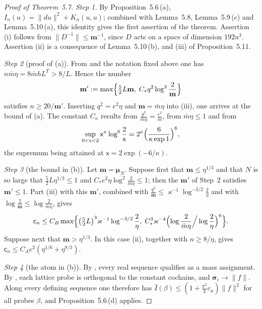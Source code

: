 \documentclass[11pt,letterpaper,reqno]{amsart}
\theoremstyle{definition}
\begin{document}
\begin{proof}[Proof of Theorem~5.7]
\emph{Step 1.}
By Proposition~5.6\,(a), $I_n(u)=\|du\|^2+K_n(u,u)$; combined with Lemma~5.8, Lemma~5.9\,(c) and Lemma~5.10\,(a), this identity gives the first assertion of the theorem.
Assertion (i) follows from $\|D^{-1}\|\le\mathbf m^{-1}$, since $D$ acts on a space of dimension $192n^3$.
Assertion (ii) is a consequence of Lemma~5.10\,(b), and (iii) of Proposition~5.11.

\emph{Step 2} (proof of (a)).
From \cite[Section~1.2]{QEDII} and the notation fixed above one has $n\bar m\eta=8\bar mhL^T>8/L$.
Hence the number
\begin{equation*}
\mathbf m':=\max\Bigl\{\tfrac52L\mathbf m,\;C_*q^2\log^2\frac2{\mathbf m}\Bigr\}
\end{equation*}
satisfies $n\ge20/\mathbf m'$.
Inserting $q^2=e^2\eta$ and $\mathbf m=\bar m\eta$ into (iii), one arrives at the bound of (a).
The constant $C_\kappa$ results from $\frac{q^2}{\bar m\eta}=\frac{e^2}{\bar m}$, from $\bar m\eta\le1$ and from
\begin{equation*}
\sup_{0<\mathsf x<2}\mathsf x^\kappa\log^6\frac2{\mathsf x}=2^\kappa\Bigl(\frac{6}{\kappa\exp1}\Bigr)^6,
\end{equation*}
the supremum being attained at $\mathsf x=2\exp(-6/\kappa)$.

\emph{Step 3} (the bound in (b)).
Let $\mathbf m=\boldsymbol\mu_N$.
Suppose first that $\mathbf m\le\eta^{1/3}$ and that $N$ is so large that $\frac52L\eta^{1/3}\le1$ and $C_*e^2\eta\log^2\frac2{\bar m\eta}\le1$; then the $\mathbf m'$ of Step~2 satisfies $\mathbf m'\le1$.
Part (iii) with this $\mathbf m'$, combined with $\frac{q^2}{\mathbf m}\le\varkappa^{-1}\log^{-3/2}\frac2\eta$ and with $\log\frac2{\mathbf m}\le\log\frac2{\bar m\eta}$, gives
\begin{equation*}
\mathsf c_n\le C_B\max\Bigl\{\bigl(\tfrac52L\bigr)^3\varkappa^{-1}\log^{-3/2}\frac2\eta,\;C_*^3\varkappa^{-4}\Bigl(\log\frac2{\bar m\eta}\Big/\log\frac2\eta\Bigr)^6\Bigr\}.
\end{equation*}
Suppose next that $\mathbf m>\eta^{1/3}$.
In this case (ii), together with $n\ge8/\eta$, gives $\mathsf c_n\le C_Ae^2(\eta^{1/6}+\eta^{8/3})$.

\emph{Step 4} (the atom in (b)).
By \cite[Section~1.2]{QEDII}, every real sequence qualifies as a mass assignment.
By \cite[Proposition~47.1\,(b1), (b5)]{QEDIII}, each lattice probe is orthogonal to the constant cochains, and $\boldsymbol\sigma_i\to\|f\|$.
Along every defining sequence one therefore has $\bar I(\beta)\le(1+\frac{\pi^2}{4}c_\varkappa)\|f\|^2$ for all probes $\beta$, and Proposition~5.6\,(d) applies.


\end{proof}
\end{document}
